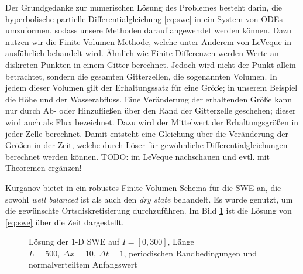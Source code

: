 Der Grundgedanke zur numerischen Lösung des Problemes besteht darin, die hyperbolische partielle Differentialgleichung \eqref{eq:swe} in ein System von ODEs umzuformen, sodass unsere Methoden darauf angewendet werden können.
Dazu nutzen wir die Finite Volumen Methode, welche unter Anderem von LeVeque in \cite{leveque2002finite} ausführlich behandelt wird. Ähnlich wie Finite Differenzen werden Werte an diskreten Punkten in einem Gitter berechnet. Jedoch wird nicht der Punkt allein betrachtet, sondern die gesamten Gitterzellen, die sogenannten Volumen. In jedem dieser Volumen gilt der Erhaltungssatz für eine Größe; in unserem Beispiel die Höhe und der Wasserabfluss. Eine Veränderung der erhaltenden Größe kann nur durch Ab- oder Hinzufließen über den Rand der Gitterzelle geschehen; dieser wird auch als Flux bezeichnet. Dazu wird der Mittelwert der Erhaltungsgrößen in jeder Zelle berechnet. Damit entsteht eine Gleichung über die Veränderung der Größen in der Zeit, welche durch Löser für gewöhnliche Differentialgleichungen berechnet werden können.
TODO: im LeVeque nachschauen und evtl. mit Theoremen ergänzen!

Kurganov bietet in \cite{kurganov2007second} ein robustes Finite Volumen Schema für die SWE an, die sowohl \textit{well balanced} ist als auch den \textit{dry state} behandelt. Es wurde genutzt, um die gewünschte Ortsdiskretisierung durchzuführen. Im Bild \ref{fig:sweSolution} ist die Lösung von \eqref{eq:swe} über die Zeit dargestellt.

\begin{figure}
 \centering
 
 \caption{Lösung der 1-D SWE auf $I=[0,300]$, Länge $L=500,~\Delta x=10,~\Delta t=1$, periodischen Randbedingungen und normalverteiltem Anfangswert}
 \label{fig:sweSolution}
\end{figure}

